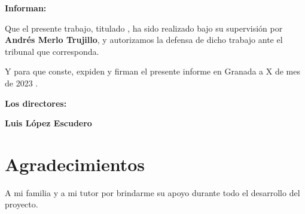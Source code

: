 

\vspace{0.5cm}

\textbf{Informan:}

\vspace{0.5cm}

Que el presente trabajo, titulado \textit{\textbf{\myTitle}},
ha sido realizado bajo su supervisión por \textbf{Andrés Merlo Trujillo}, y autorizamos la defensa de dicho trabajo ante el tribunal
que corresponda.

\vspace{0.5cm}

Y para que conste, expiden y firman el presente informe en Granada a X de mes de 2023 .

\vspace{1cm}

\textbf{Los directores:}

\vspace{5cm}

\noindent \textbf{Luis López Escudero}%

\chapter*{Agradecimientos}
\thispagestyle{empty}

       \vspace{1cm}


A mi familia y a mi tutor por brindarme su apoyo durante todo el desarrollo del proyecto.

